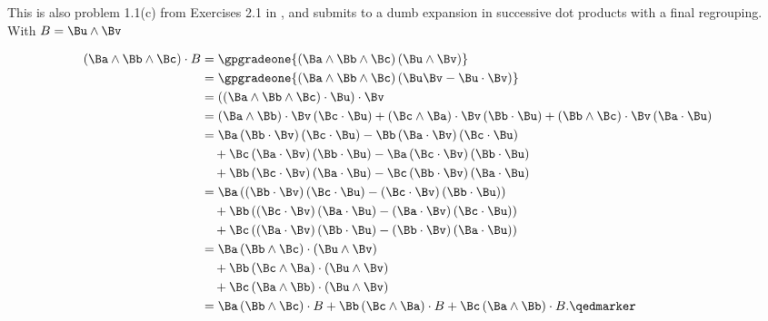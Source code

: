 This is also problem 1.1(c) from Exercises 2.1 in \citep{hestenes1999nfc}, and submits to a dumb expansion in successive dot products with a final regrouping.  With \(B = \Bu \wedge \Bv\)

\begin{equation}\label{eqn:stokesTheoremGeometricAlgebra:2860}
\begin{aligned}
\left(  \Ba \wedge \Bb \wedge \Bc  \right)
\cdot B
&=
\gpgradeone{
\left(  \Ba \wedge \Bb \wedge \Bc \right)
 \left( \Bu \wedge \Bv \right) } \\
&=
\gpgradeone{
\left(  \Ba \wedge \Bb \wedge \Bc  \right)
\left(
\Bu \Bv
- \Bu \cdot \Bv
\right) } \\
&=
\left(
\left(  \Ba \wedge \Bb \wedge \Bc  \right)
 \cdot \Bu \right) \cdot \Bv \\
&=
\left( \Ba \wedge \Bb \right) \cdot \Bv \left( \Bc \cdot \Bu \right)
+
\left( \Bc \wedge \Ba \right) \cdot \Bv \left( \Bb \cdot \Bu \right)
+
\left( \Bb \wedge \Bc \right) \cdot \Bv \left( \Ba \cdot \Bu \right) \\
&=
\Ba
\left(  \Bb \cdot \Bv  \right)
\left( \Bc \cdot \Bu \right)
-\Bb
\left(  \Ba \cdot \Bv  \right)
\left( \Bc \cdot \Bu \right) \\
&\quad +
\Bc
\left(  \Ba \cdot \Bv  \right)
\left( \Bb \cdot \Bu \right)
-
\Ba
\left(  \Bc \cdot \Bv  \right)
\left( \Bb \cdot \Bu \right) \\
&\quad +
\Bb
\left(  \Bc \cdot \Bv  \right)
\left( \Ba \cdot \Bu \right)
-
\Bc
\left(  \Bb \cdot \Bv  \right)
\left( \Ba \cdot \Bu \right) \\
&=
\Ba
\left(  \left(  \Bb \cdot \Bv  \right) \left( \Bc \cdot \Bu \right) - \left(  \Bc \cdot \Bv  \right) \left( \Bb \cdot \Bu \right)  \right)
\\
&\quad +
\Bb
\left(  \left(  \Bc \cdot \Bv  \right) \left( \Ba \cdot \Bu \right) - \left(  \Ba \cdot \Bv  \right) \left( \Bc \cdot \Bu \right)  \right)
\\
&\quad +
\Bc
\left(  \left(  \Ba \cdot \Bv  \right) \left( \Bb \cdot \Bu \right) - \left(  \Bb \cdot \Bv  \right) \left( \Ba \cdot \Bu \right)  \right)
 \\
&=
\Ba
\left(  \Bb \wedge \Bc  \right)
\cdot
\left(  \Bu \wedge \Bv  \right)
\\
&\quad +
\Bb
\left(  \Bc \wedge \Ba  \right)
\cdot
\left(  \Bu \wedge \Bv  \right)
\\
&\quad +
\Bc
\left(  \Ba \wedge \Bb  \right)
 \cdot
\left(  \Bu \wedge \Bv  \right)
\\
&=
\Ba
\left(  \Bb \wedge \Bc  \right)
\cdot B
+
\Bb
\left(  \Bc \wedge \Ba  \right)
 \cdot B
+
\Bc
\left(  \Ba \wedge \Bb  \right)
\cdot B. \qedmarker
\end{aligned}
\end{equation}

